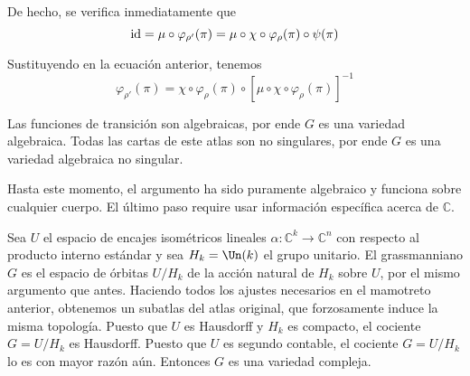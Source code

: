 \begin{solution}
De hecho, se verifica inmediatamente que
$$\operatorname{id} = \mu \circ \varphi_{\rho'}(\pi) = \mu \circ \chi \circ \varphi_\rho(\pi) \circ \psi(\pi)$$

Sustituyendo en la ecuación anterior, tenemos
$$\varphi_{\rho'}(\pi) = \chi \circ \varphi_\rho(\pi) \circ [\mu \circ \chi \circ \varphi_\rho(\pi)]^{-1}$$

Las funciones de transición son algebraicas, por ende $G$ es una variedad algebraica. Todas las cartas de este atlas son no singulares, por ende $G$ es una variedad algebraica no singular.

Hasta este momento, el argumento ha sido puramente algebraico y funciona sobre cualquier cuerpo. El último paso require usar información específica acerca de $\mathbb C$.

Sea $U$ el espacio de encajes isométricos lineales $\alpha : \mathbb C^k \to \mathbb C^n$ con respecto al producto interno estándar y sea $H_k = \Un(k)$ el grupo unitario. El grassmanniano $G$ es el espacio de órbitas $U / H_k$ de la acción natural de $H_k$ sobre $U$, por el mismo argumento que antes. Haciendo todos los ajustes necesarios en el mamotreto anterior, obtenemos un subatlas del atlas original, que forzosamente induce la misma topología. Puesto que $U$ es Hausdorff y $H_k$ es compacto, el cociente $G = U/H_k$ es Hausdorff. Puesto que $U$ es segundo contable, el cociente $G = U/H_k$ lo es con mayor razón aún. Entonces $G$ es una variedad compleja.
\end{solution}
